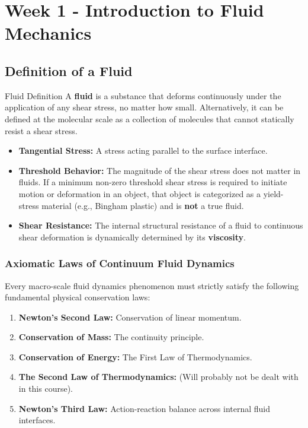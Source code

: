 \section{Week 1 - Introduction to Fluid Mechanics}
\subsection{Definition of a Fluid}
\begin{defbox}{Fluid Definition}
A \textbf{fluid} is a substance that deforms continuously under the application of any shear stress, no matter how small. Alternatively, it can be defined at the molecular scale as a collection of molecules that cannot statically resist a shear stress.
\end{defbox}

\begin{itemize}
    \item \textbf{Tangential Stress:} A stress acting parallel to the surface interface.
    \item \textbf{Threshold Behavior:} The magnitude of the shear stress does not matter in fluids. If a minimum non-zero threshold shear stress is required to initiate motion or deformation in an object, that object is categorized as a yield-stress material (e.g., Bingham plastic) and is \textbf{not} a true fluid.
    \item \textbf{Shear Resistance:} The internal structural resistance of a fluid to continuous shear deformation is dynamically determined by its \textbf{viscosity}.
\end{itemize}

\subsubsection{Axiomatic Laws of Continuum Fluid Dynamics}

Every macro-scale fluid dynamics phenomenon must strictly satisfy the following fundamental physical conservation laws:
\begin{enumerate}
    \item \textbf{Newton's Second Law:} Conservation of linear momentum.
    \item \textbf{Conservation of Mass:} The continuity principle.
    \item \textbf{Conservation of Energy:} The First Law of Thermodynamics.
    \item \textbf{The Second Law of Thermodynamics:} (Will probably not be dealt with in this course).
    \item \textbf{Newton's Third Law:} Action-reaction balance across internal fluid interfaces.
\end{enumerate}

